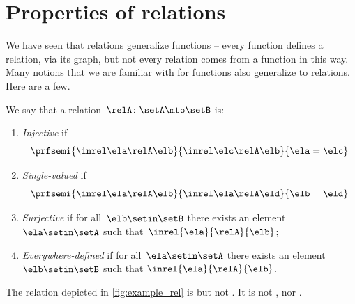 
\section{Properties of relations}

We have seen that relations generalize functions -- every function defines a relation, via its graph, but not every relation comes from a function in this way.
Many notions that we are familiar with for functions also generalize to relations.
Here are a few.

\begin{ctdefinition}
    \label{def:rel_properties}
    We say that a relation~$\relA \colon \setA \mto \setB$ is:
    \begin{enumerate}
        \item \label{def:injective-relation} \emph{Injective} if
              \begin{equation}
                  \prfsemi{
                      \inrel \ela \relA \elb
                  }{
                      \inrel \elc \relA \elb
                  }{
                      \ela=\elc
                  }
              \end{equation}
        \item \label{def:single-valued-relation} \emph{Single-valued} if
              \begin{equation}
                  \prfsemi{
                      \inrel \ela \relA \elb
                  }{
                      \inrel \ela \relA \eld
                  }{
                      \elb = \eld
                  }
              \end{equation}
        \item \label{def:surjective-relation} \emph{Surjective} if for all~$\elb\setin \setB$ there exists an element~$\ela\setin \setA$ such that~$\inrel{\ela}{\relA}{\elb}$;
        \item \label{def:everywhere-defined-relation} \emph{Everywhere-defined} if for all~$\ela\setin \setA$ there exists an element~$\elb \setin \setB$ such that $\inrel{\ela}{\relA}{\elb}$.
    \end{enumerate}
\end{ctdefinition}

\begin{example}
    The relation depicted in \cref{fig:example_rel} is  but not .
    It is not , nor .
\end{example}

